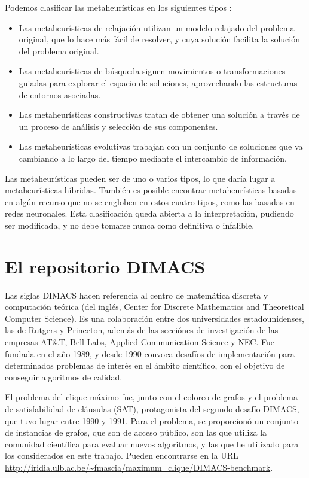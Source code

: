 Podemos clasificar las metaheurísticas en los siguientes tipos \citep{melian:2003}:
\begin{itemize}
  \item Las metaheurísticas de relajación utilizan un modelo relajado del problema
        original, que lo hace más fácil de resolver, y cuya solución facilita la
        solución del problema original.

  \item Las metaheurísticas de búsqueda siguen movimientos o transformaciones guiadas
        para explorar el espacio de soluciones, aprovechando las estructuras de
        entornos asociadas.

  \item Las metaheurísticas constructivas tratan de obtener una solución a través
        de un proceso de análisis y selección de sus componentes.

  \item Las metaheurísticas evolutivas trabajan con un conjunto de soluciones que
        va cambiando a lo largo del tiempo mediante el intercambio de información.
\end{itemize}

Las metaheurísticas pueden ser de uno o varios tipos, lo que daría lugar a metaheurísticas
híbridas. También es posible encontrar metaheurísticas basadas en algún recurso que
no se engloben en estos cuatro tipos, como las basadas en redes neuronales. Esta
clasificación queda abierta a la interpretación, pudiendo ser modificada, y no
debe tomarse nunca como definitiva o infalible.

\section{El repositorio DIMACS}
Las siglas DIMACS hacen referencia al centro de matemática discreta y computación
teórica (del inglés, Center for Discrete Mathematics and Theoretical Computer Science).
Es una colaboración entre dos universidades estadounidenses, las de Rutgers y Princeton,
además de las secciónes de investigación de las empresas AT\&T, Bell Labs, Applied
Communication Science y NEC. Fue fundada en el año 1989, y desde 1990 convoca desafíos
de implementación para determinados problemas de interés en el ámbito científico, con
el objetivo de conseguir algoritmos de calidad.

El problema del clique máximo fue, junto con el coloreo de grafos y el problema de satisfabilidad
de cláusulas (SAT), protagonista del segundo desafío DIMACS, que tuvo lugar entre 1990 y 1991.
Para el problema, se proporcionó un conjunto de instancias de grafos, que son de acceso público,
son las que utiliza la comunidad científica para evaluar nuevos algoritmos, y las que he utilizado
para los considerados en este trabajo. Pueden encontrarse en la URL
\url{http://iridia.ulb.ac.be/~fmascia/maximum_clique/DIMACS-benchmark}.

